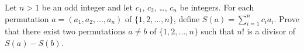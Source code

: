 Let $n > 1$ be an odd integer and let $c_1$, $c_2$, \dots, $c_n$ be integers.
For each permutation $a = (a_1, a_2, \dots, a_n)$
of $\{1,2,\dots,n\}$, define $S(a) = \sum_{i=1}^n c_i a_i$.
Prove that there exist two permutations $a \neq b$
of $\{1,2,\dots,n\}$ such that $n!$ is a divisor of $S(a)-S(b)$.